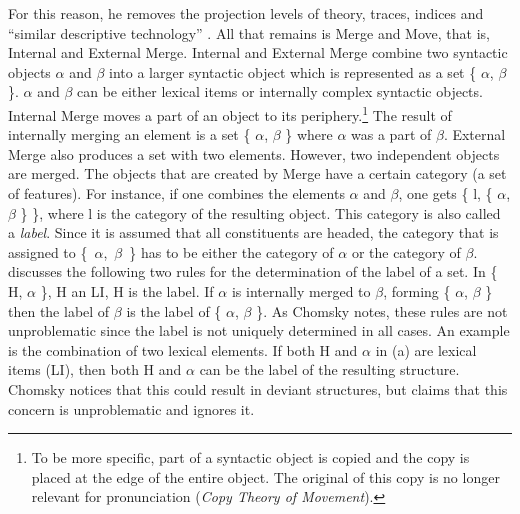 For this reason, he removes the projection levels of \xbar theory, traces,
indices and ``similar descriptive technology'' \citep[]{Chomsky2008a}. All that remains is Merge and Move, that is, Internal and External Merge. Internal and External Merge combine two syntactic objects $\alpha$ and $\beta$ into a larger
syntactic object which is represented as a set \{ $\alpha$, $\beta$ \}.  $\alpha$ and $\beta$ can be
either lexical items or internally complex syntactic objects. Internal Merge moves a part of an object to its periphery.\footnote{%
To be more specific, part of a syntactic object is copied and the copy is placed at the edge of the entire object. The original of this copy is
no longer relevant for pronunciation (\emph{Copy Theory of Move\-ment}).
} The result of internally merging
an element is a set \{ $\alpha$, $\beta$ \} where $\alpha$ was a part of $\beta$. External Merge
also produces a set with two elements. However, two independent objects are merged. The objects that are created
by Merge have a certain category (a set of features). For instance, if one combines the elements $\alpha$ and $\beta$, one
gets \{ l, \{ $\alpha$, $\beta$ \} \}, where l is the category of the resulting object. This category
is also called a \emph{label}. Since it is assumed that all constituents are headed, the category that is
assigned to \{~$\alpha$,~$\beta$~\} has to be either the category of $\alpha$ or the category of
$\beta$. 
\citet[]{Chomsky2008a} discusses the following two rules for the determination of the label of a set.
\eal
\label{Label-Berechnung}
\ex\label{Label1} In \{ H, $\alpha$ \}, H an LI, H is the label.
\ex\label{Label2} If $\alpha$ is internally merged to $\beta$, forming \{ $\alpha$, $\beta$ \} then
the label of $\beta$ is the label of \{ $\alpha$, $\beta$ \}.
\zl
As Chomsky notes, these rules are not unproblematic since the label is not uniquely determined in all
cases. An example is the combination of two lexical elements. If both H and $\alpha$ in (a)
are lexical items (LI), then both H and $\alpha$ can be the label of the resulting
structure. Chomsky notices that this could result in deviant structures, but
claims that this concern is unproblematic and ignores it. 
